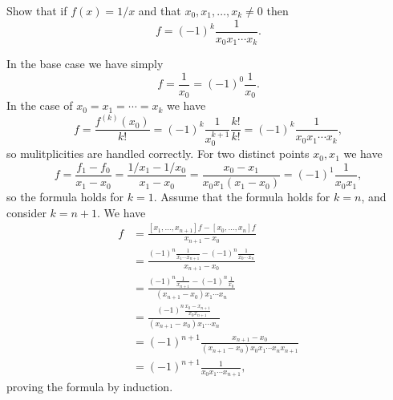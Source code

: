 \begin{exercise}
    Show that if $f(x) = 1/x$ and that $x_0, x_1, \ldots, x_k \neq 0$ then
    \begin{equation*}
        [x_0, \ldots, x_k]f = (-1)^k \frac{1}{x_0 x_1 \cdots x_k}.
    \end{equation*}
\end{exercise}

\begin{solution}
    In the base case we have simply
    \begin{equation*}
        [x_0]f = \frac{1}{x_0} = (-1)^0 \frac{1}{x_0}.
    \end{equation*}
    In the case of $x_0 = x_1 = \cdots = x_k$ we have
    \begin{equation*}
        [\underbrace{x_0, x_0, \ldots, x_0}_{k+1}]f = \frac{f^{(k)}(x_0)}{k!} = (-1)^k \frac{1}{x_0^{k+1}} \frac{k!}{k!} = (-1)^k \frac{1}{x_0 x_1 \cdots x_k},
    \end{equation*}
    so mulitplicities are handled correctly.
    For two distinct points $x_0, x_1$ we have
    \begin{equation*}
        [x_0, x_1]f = \frac{f_1 - f_0}{x_1 - x_0} = \frac{1/x_1 - 1/x_0}{x_1 - x_0} = \frac{x_0 - x_1}{x_0 x_1 (x_1 - x_0)} = (-1)^1 \frac{1}{x_0 x_1},
    \end{equation*}
    so the formula holds for $k = 1$.
    Assume that the formula holds for $k = n$, and consider $k = n + 1$.
    We have
    \begin{align*}
        [x_0, \ldots, x_{n+1}]f
        &= \frac{[x_1, \ldots, x_{n+1}]f - [x_0, \ldots, x_{n}]f}{x_{n+1} - x_0} \\
        &= \frac{(-1)^n \frac{1}{x_1 \cdots x_{n+1}} - (-1)^n \frac{1}{x_0 \cdots x_n}}{x_{n+1} - x_0} \\
        &= \frac{
            (-1)^n \frac{1}{x_{n+1}} - (-1)^n \frac{1}{x_0}
        }{
            (x_{n+1} - x_0) x_1 \cdots x_n
        } \\
        &= \frac{
            (-1)^n \frac{x_0 - x_{n+1}}{x_0 x_{n+1}}
        }{
            (x_{n+1} - x_0) x_1 \cdots x_n
        } \\
        &= (-1)^{n+1}\frac{
            x_{n+1} - x_0
        }{
            (x_{n+1} - x_0) x_0 x_1 \cdots x_n x_{n+1}
        } \\
        &= (-1)^{n+1}\frac{1}{x_0 x_1 \cdots x_{n+1}},
    \end{align*}
    proving the formula by induction.
\end{solution}

